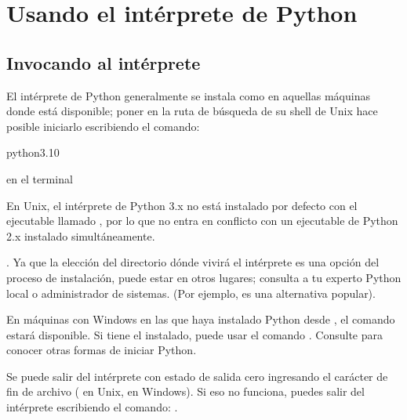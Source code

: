 \documentclass[a5paper,10pt,spanish]{sphinxmanual}
\begin{document}
\chapter{Usando el intérprete de Python}
\label{\detokenize{tutorial/interpreter:using-the-python-interpreter}}\label{\detokenize{tutorial/interpreter:tut-using}}\label{\detokenize{tutorial/interpreter::doc}}

\section{Invocando al intérprete}
\label{\detokenize{tutorial/interpreter:invoking-the-interpreter}}\label{\detokenize{tutorial/interpreter:tut-invoking}}
\sphinxAtStartPar
El intérprete de Python generalmente se instala como  en aquellas máquinas donde está disponible; poner  en la ruta de búsqueda de su shell de Unix hace posible iniciarlo escribiendo el comando:

\begin{sphinxVerbatim}[commandchars=\\\{\}]
python3.10
\end{sphinxVerbatim}

\sphinxAtStartPar
en el terminal %
\begin{footnote}[1]\sphinxAtStartFootnote
En Unix, el intérprete de Python 3.x no está instalado por defecto con el ejecutable llamado , por lo que no entra en conflicto con un ejecutable de Python 2.x instalado simultáneamente.
%
\end{footnote}. Ya que la elección del directorio dónde vivirá el intérprete es una opción del proceso de instalación, puede estar en otros lugares; consulta a tu experto Python local o administrador de sistemas. (Por ejemplo,  es una alternativa popular).

\sphinxAtStartPar
En máquinas con Windows en las que haya instalado Python desde , el comando  estará disponible. Si tiene el  instalado, puede usar el comando . Consulte  para conocer otras formas de iniciar Python.

\sphinxAtStartPar
Se puede salir del intérprete con estado de salida cero ingresando el carácter de fin de archivo ( en Unix,  en Windows). Si eso no funciona, puedes salir del intérprete escribiendo el comando: .
\end{document}
